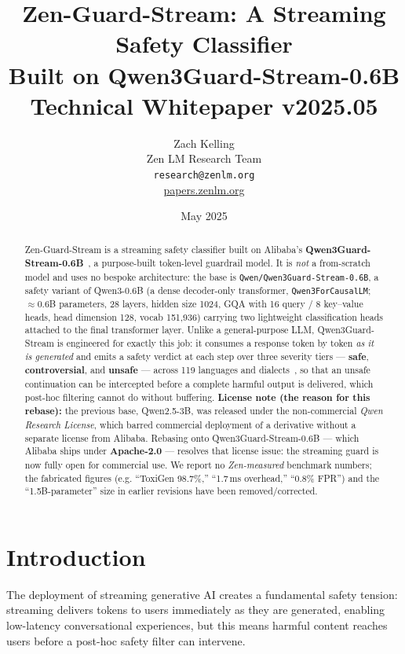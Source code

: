 \documentclass[11pt,a4paper]{article}
\title{\textbf{Zen-Guard-Stream: A Streaming Safety Classifier\\
Built on Qwen3Guard-Stream-0.6B}\\[0.5em]
\large Technical Whitepaper v2025.05}
\author{Zach Kelling \\ Zen LM Research Team\\
\texttt{research@zenlm.org}\\
\href{https://papers.zenlm.org}{papers.zenlm.org}}
\date{May 2025}
\begin{document}
\maketitle

\begin{abstract}
Zen-Guard-Stream is a streaming safety classifier built on Alibaba's
\textbf{Qwen3Guard-Stream-0.6B}~\cite{qwen3guard}, a purpose-built token-level guardrail model.
It is \emph{not} a from-scratch model and uses no bespoke architecture: the base is
\texttt{Qwen/Qwen3Guard-Stream-0.6B}, a safety variant of Qwen3-0.6B (a dense decoder-only
transformer, \texttt{Qwen3ForCausalLM}; $\approx$0.6B parameters, 28 layers, hidden size 1024,
GQA with 16 query / 8 key--value heads, head dimension 128, vocab 151{,}936) carrying two
lightweight classification heads attached to the final transformer layer. Unlike a
general-purpose LLM, Qwen3Guard-Stream is engineered for exactly this job: it consumes a
response token by token \emph{as it is generated} and emits a safety verdict at each step over
three severity tiers --- \textbf{safe}, \textbf{controversial}, and \textbf{unsafe} --- across
119 languages and dialects~\cite{qwen3guard}, so that an unsafe continuation can be intercepted
before a complete harmful output is delivered, which post-hoc filtering cannot do without
buffering. \textbf{License note (the reason for this rebase):} the previous base, Qwen2.5-3B,
was released under the non-commercial \emph{Qwen Research License}, which barred commercial
deployment of a derivative without a separate license from Alibaba. Rebasing onto
Qwen3Guard-Stream-0.6B --- which Alibaba ships under \textbf{Apache-2.0} --- resolves that
license issue: the streaming guard is now fully open for commercial use. We report no
\emph{Zen-measured} benchmark numbers; the fabricated figures (e.g. ``ToxiGen 98.7\%,''
``1.7\,ms overhead,'' ``0.8\% FPR'') and the ``1.5B-parameter'' size in earlier revisions have
been removed/corrected.
\end{abstract}

\tableofcontents
\newpage

\section{Introduction}

The deployment of streaming generative AI creates a fundamental safety tension: streaming delivers tokens to users immediately as they are generated, enabling low-latency conversational experiences, but this means harmful content reaches users before a post-hoc safety filter can intervene.
\end{document}
